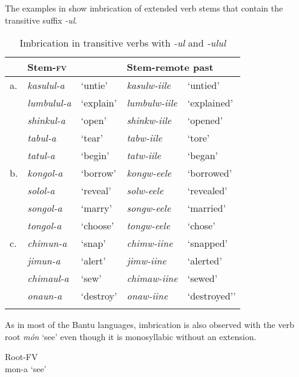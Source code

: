 \documentclass[output=paper]{langsci/langscibook}
\begin{document}
\z

The examples in  show imbrication of extended verb stems that contain the transitive suffix \textit{-ul}.


\begin{table}
\begin{tabularx}{\textwidth}{llXlX}
\lsptoprule
 & Stem-\textsc{fv} &  & \multicolumn{2}{l}{Stem-remote past} \\
\midrule
a. & \textit{kasulul-a} & `untie' & \textit{kasulw-iile} & `untied' \\
 & \textit{lumbulul-a} & `explain' & \textit{lumbulw-iile} & `explained' \\
 & \textit{shinkul-a} & `open' & \textit{shinkw-iile} & `opened' \\
 & \textit{tabul-a} & `tear' & \textit{tabw-iile} & `tore' \\
 & \textit{tatul-a} & `begin' & \textit{tatw-iile} & `began' \\
\tablevspace
b. & \textit{kongol-a} & `borrow' & \textit{kongw-eele} & `borrowed' \\
 & \textit{solol-a} & `reveal' & \textit{solw-eele} & `revealed' \\
 & \textit{songol-a} & `marry' & \textit{songw-eele} & `married' \\
 & \textit{tongol-a} & `choose' & \textit{tongw-eele} & `chose' \\
\tablevspace
c. & \textit{chimun-a} & `snap' & \textit{chimw-iine} & `snapped' \\
 & \textit{jimun-a} & `alert' & \textit{jimw-iine} & `alerted' \\
 & \textit{chimaul-a} & `sew' & \textit{chimaw-iine} & `sewed' \\
 & \textit{onaun-a} & `destroy' & \textit{onaw-iine} & `destroyed’' \\

\lspbottomrule
\end{tabularx}

\caption{Imbrication in transitive verbs with \textit{-ul} and \textit{-ulul}}
\label{tab:23.kawasha}

\end{table}


As in most of the Bantu languages, imbrication is also observed with the verb root \textit{món} ‘see’ even though it is monosyllabic without an extension. 

\ea\label{ex:8.kawasha}
   \ea\label{ex:8a.kawasha} Root-FV \\
   mon-a ‘see’
   
\end{document}
